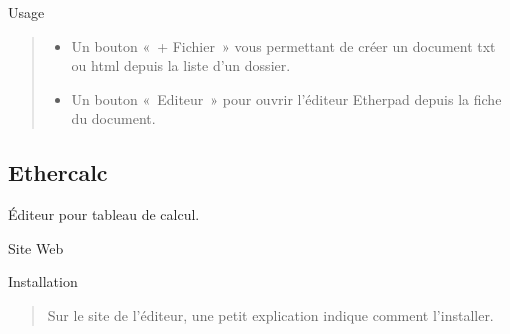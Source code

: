 \documentclass[a4paper,10pt,oneside,french]{sphinxmanual}
\begin{document}
\begin{sphinxVerbatim}[commandchars=\\\{\}]
     
\end{sphinxVerbatim}

\sphinxAtStartPar
Usage
\begin{quote}
\begin{description}
\begin{itemize}
\item {} 
\sphinxAtStartPar
Un bouton « + Fichier » vous permettant de créer un document txt ou html depuis la liste d’un dossier.

\item {} 
\sphinxAtStartPar
Un bouton « Editeur » pour ouvrir l’éditeur Etherpad depuis la fiche du document.

\end{itemize}

\end{description}
\end{quote}

\noindent{}


\subsection{Ethercalc}
\label{\detokenize{documents/editor:ethercalc}}
\sphinxAtStartPar
Éditeur pour tableau de calcul.

\sphinxAtStartPar
Site Web
\begin{quote}

\sphinxAtStartPar
{}
\end{quote}

\sphinxAtStartPar
Installation
\begin{quote}

\sphinxAtStartPar
Sur le site de l’éditeur, une petit explication indique comment l’installer.
\end{quote}
\end{document}
